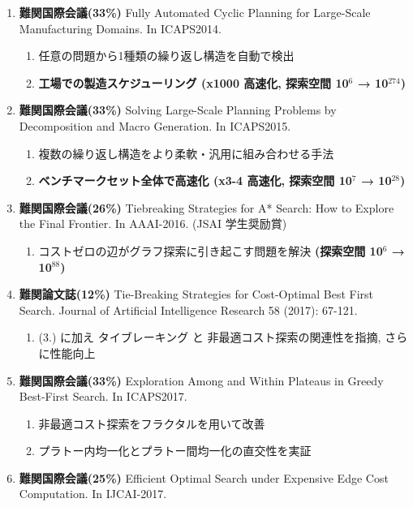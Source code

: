 \begin{smaller}
\begin{enumerate}
\item \textbf{難関国際会議(33\%)} Fully Automated Cyclic Planning for Large-Scale Manufacturing Domains. In ICAPS2014.
\begin{enumerate}
\item 任意の問題から1種類の繰り返し構造を自動で検出
\item \textbf{工場での製造スケジューリング (x1000 高速化, 探索空間 10$^{\text{6}}$ → 10$^{\text{274}}$)}
\end{enumerate}
\item \textbf{難関国際会議(33\%)} Solving Large-Scale Planning Problems by Decomposition and Macro Generation. In ICAPS2015.
\begin{enumerate}
\item 複数の繰り返し構造をより柔軟・汎用に組み合わせる手法
\item \textbf{ベンチマークセット全体で高速化 (x3-4 高速化, 探索空間 10$^{\text{7}}$ → 10$^{\text{28}}$)}
\end{enumerate}
\item \textbf{難関国際会議(26\%)} Tiebreaking Strategies for A* Search: How to Explore the Final Frontier. In AAAI-2016. (JSAI 学生奨励賞)
\begin{enumerate}
\item コストゼロの辺がグラフ探索に引き起こす問題を解決 \textbf{(探索空間 10$^{\text{6}}$ → 10$^{\text{88}}$)}
\end{enumerate}
\item \textbf{難関論文誌(12\%)}   Tie-Breaking Strategies for Cost-Optimal Best First Search. Journal of Artificial Intelligence Research 58 (2017): 67-121.
\begin{enumerate}
\item (3.) に加え タイブレーキング と 非最適コスト探索の関連性を指摘, さらに性能向上
\end{enumerate}
\item \textbf{難関国際会議(33\%)} Exploration Among and Within Plateaus in Greedy Best-First Search. In ICAPS2017.
\begin{enumerate}
\item 非最適コスト探索をフラクタルを用いて改善
\item プラトー内均一化とプラトー間均一化の直交性を実証
\end{enumerate}
\item \textbf{難関国際会議(25\%)} Efficient Optimal Search under Expensive Edge Cost Computation. In IJCAI-2017.

\end{enumerate}
\end{smaller}
